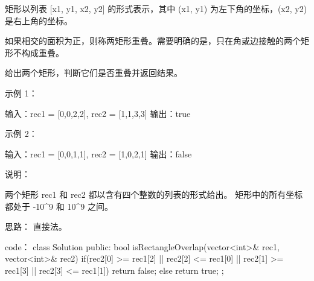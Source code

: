 矩形以列表 [x1, y1, x2, y2] 的形式表示，其中 (x1, y1) 为左下角的坐标，(x2, y2) 是右上角的坐标。

如果相交的面积为正，则称两矩形重叠。需要明确的是，只在角或边接触的两个矩形不构成重叠。

给出两个矩形，判断它们是否重叠并返回结果。

示例 1：

输入：rec1 = [0,0,2,2], rec2 = [1,1,3,3]
输出：true

示例 2：

输入：rec1 = [0,0,1,1], rec2 = [1,0,2,1]
输出：false

说明：

    两个矩形 rec1 和 rec2 都以含有四个整数的列表的形式给出。
    矩形中的所有坐标都处于 -10^9 和 10^9 之间。






























思路：
直接法。






























code：
class Solution {
public:
    bool isRectangleOverlap(vector<int>& rec1, vector<int>& rec2) {
        if(rec2[0] >= rec1[2] || rec2[2] <= rec1[0] || rec2[1] >= rec1[3] || rec2[3] <= rec1[1]) return false;
        else return true;
    }
};